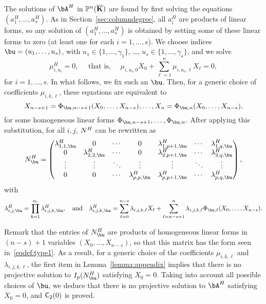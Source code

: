 \documentclass[12pt]{article}
\begin{document}
The solutions of $\bA^H$ in $\mathbb{P}^n(\overline{\mathbf{K}})$ are found by first solving
the equations $(a^H_1,\dots,a^H_s)$. As in Section~\ref{sec:columndegree}, all
$a_i^H$ are products of linear forms, so any solution of
$(a^H_1,\dots,a^H_s)$ is obtained by setting some of these linear forms
to zero (at least one for each $i=1,\dots,s$). We choose indices $\bu=(u_1,\dots,u_s)$, with
$u_1\in\{1,\dots,\gamma_1\}$, \dots, $u_s\in\{1,\dots,\gamma_s\}$, and
we solve
$$\mu^H_{i,u_i}=0, \quad \text{~that is,~} \quad \mu_{i,u_i,0}X_0 + \sum_{\ell = 1}^{n}\mu_{i,u_i,\ell}X_\ell =0,$$ for $i=1,\dots,s$.
In what follows, we fix such an $\bu$.
Then, for a generic choice of coefficients $\mu_{i,k,\ell}$, these equations
are equivalent to
$$X_{n-s+1}=\Phi_{\bu,n-s+1}(X_0,\dots,X_{n-s}),\dots,X_{n}=\Phi_{\bu,n}(X_0,\dots,X_{n-s}),$$
for some homogeneous linear forms $\Phi_{\bu,n-s+1},\dots,\Phi_{\bu,n}$.
After applying this substitution, for all $i,j$,
${N}^H$ can be rewritten as 
\begin{align*}
 \mN^H_\bu = \left( \begin{matrix}
\lambda^H_{1,1,\bu} & 0 & \cdots & 0 & \lambda^H_{1,p+1,\bu} & \cdots & \lambda^H_{1, q,\bu}\\
0 & \lambda^H_{2,2,\bu} & \cdots & 0 & \lambda^H_{2,p+1,\bu} & \cdots & \lambda^H_{2, q,\bu}\\
\vdots & \vdots & \ddots & \vdots & \vdots & \ddots & \vdots\\
0 & 0 & \cdots & \lambda^H_{p,p,\bu} & \lambda^H_{p,p+1,\bu} & \cdots & \lambda^H_{p, q,\bu}
\end{matrix} \right),
\end{align*}
with
$$\lambda^H_{i,j,\bu}=\prod_{k=1}^{\alpha_i}\lambda^H_{i,j,k,\bu},
\quad\text{and}\quad \lambda^H_{i,j,k,\bu}=\sum_{\ell =
  0}^{n-s}\lambda_{i,j,k,\ell}X_\ell + \sum_{\ell =
  n-s+1}^{n}\lambda_{i,j,k,\ell}
\Phi_{\bu,\ell}(X_0,\dots,X_{n-s}).$$ 

Remark that the entries of $\mN^H_\bu$ are products of homogeneous
linear forms in $(n-s)+1$ variables $(X_0,\dots,X_{n-s})$, so that
this matrix has the form seen in~\eqref{eqdef:type1}. As a result, for
a generic choice of the coefficients $\mu_{i,k,\ell}$ and
$\lambda_{i,j,k,\ell}$, the first item in Lemma~\ref{lemma:appendix}
implies that there is no projective solution to $I_p(\mN^H_\bu)$
satisfying $X_0=0$. Taking into account all possible choices of $\bu$,
we deduce that there is no projective solution to $\bA^H$ satisfying
$X_0=0$, and  $\mathsf{C}_2(0)$ is proved.
\end{document}

